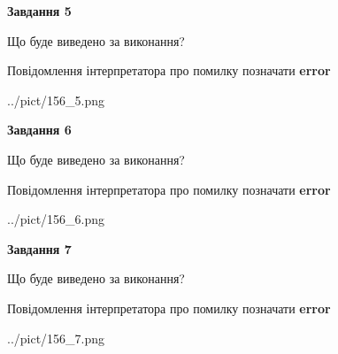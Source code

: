 \documentclass[10pt, ukrainian]{article}
\begin{document}
{\begin {large}
{\begin {center}\textbf{Завдання 5}\end {center}}\par
Що буде виведено за виконання? \par
Повідомлення інтерпретатора про помилку позначати \textbf{error}

\begin{center}
	{../pict/156_5.png}
\end{center}
\newpage

{\begin {center}\textbf{Завдання 6}\end {center}}\par
Що буде виведено за виконання? \par
Повідомлення інтерпретатора про помилку позначати \textbf{error}

\begin{center}
	{../pict/156_6.png}
\end{center}
\newpage

{\begin {center}\textbf{Завдання 7}\end {center}}\par
Що буде виведено за виконання? \par
Повідомлення інтерпретатора про помилку позначати \textbf{error}

\begin{center}
	{../pict/156_7.png}
\end{center}
\newpage

\end {large}}
\end{document}
